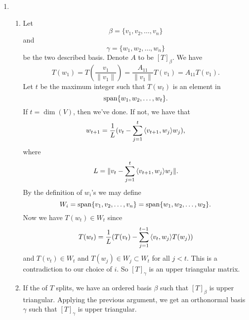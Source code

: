 \begin{enumerate}
\item \begin{enumerate}
\item Let 
\[\beta =\{v_1,v_2,\ldots ,v_n\}\]
and 
\[\gamma=\{w_1,w_2,\ldots ,w_n\}\]
be the two described basis. Denote $A$ to be $[T]_{\beta}$. We have 
\[T(w_1)=T(\frac{v_1}{\|v_1\|})=\frac{A_{11}}{\|v_1\|}T(v_1)=A_{11}T(v_1).\]
Let $t$ be the maximum integer such that $T(w_{t})$ is an element in 
\[\sp\{w_1,w_2,\ldots ,w_{t}\}.\]
If $t=\dim (V)$, then we've done. If not, we have that 
\[w_{t+1}=\frac{1}{L}(v_t-\sum_{j=1}^{t}{\lag v_{t+1},w_j\rag w_j}),\]
where 
\[L=\|v_t-\sum_{j=1}^{t}{\lag v_{t+1},w_j\rag w_j}\|.\]
By the definition of $w_i$'s we may define 
\[W_i=\sp\{v_1,v_2,\ldots ,v_n\}=\sp\{w_1,w_2,\ldots,w_2\}.\]
Now we have $T(w_t)\in W_t$ since 
\[T(w_t)=\frac{1}{L}(T(v_t)-\sum_{j=1}^{t-1}{\lag v_t,w_j\rag T(w_j)})\]
and $T(v_t)\in W_t$ and $T(w_j)\in W_j\subset W_t$ for all $j<t$. This is a contradiction to our choice of $i$. So $[T]_{\gamma}$ is an upper triangular matrix.
\item If the \charpoly{} of $T$ splits, we have an ordered basis $\beta $ such that $[T]_{\beta }$ is upper triangular. Applying the previous argument, we get an orthonormal basis $\gamma $ such that $[T]_{\gamma}$ is upper triangular.
\end{enumerate}
\end{enumerate}
